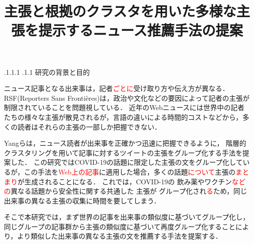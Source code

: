 \documentclass[a4paper, twocolumn, 10pt]{jarticle}
\makeatletter
\def\section{%
	\@startsection{section}{1}{\z@}%
	{.1\Cvs \@plus.1\Cdp \@minus.1\Cdp}%
	{.1\Cvs \@plus.1\Cdp}%
	{\normalfont\normalsize\bfseries}%
}
\makeatother
\begin{document}
\title{主張と根拠のクラスタを用いた多様な主張を提示するニュース推薦手法の提案}

\maketitle

\thispagestyle{empty}

\section{研究の背景と目的}

ニュース記事となる出来事は，記者\textcolor{red}{ごとに}受け取り方や伝え方が異なる．
RSF(Reporters Sans Frontières)は，政治や文化などの要因によって記者の主張が制限されていることを問題視している\cite{2021_world_press_freedom_index}．
近年のWebニュースには世界中の記者たちの様々な主張が散見されるが，言語の違いによる時間的コストなどから，多くの読者はそれらの主張の一部しか把握できない．

Yangらは，ニュース読者が出来事を正確かつ迅速に把握できるように，
階層的クラスタリングを用いて記事に対するツイートの主張をグループ化する手法を提案した\cite{yang_scalable_2021}．
この研究ではCOVID-19の話題に限定した主張の文をグループ化しているが，この手法を\textcolor{red}{Web上の記事}に適用した場合，多くの話題\textcolor{red}{について}主張の\textcolor{red}{まとまり}が生成されることになる．
これでは，COVID-19の
飲み薬やワクチン\textcolor{red}{などの}異なる話題から安全性に関する共通した
主張が
グループ化され\textcolor{red}{る}ため，同じ出来事の異なる主張の収集に時間を要してしまう．






そこで本研究では，まず世界の記事を出来事の類似度に基づいてグループ化し，同じグループの記事群から主張の類似度に基づいて再度グループ化することにより，より類似した出来事の異なる主張の文を推薦する手法を提案する．
\end{document}
